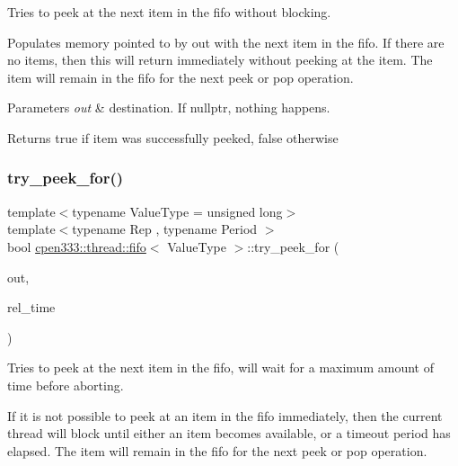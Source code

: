Tries to peek at the next item in the fifo without blocking. 

Populates memory pointed to by {\ttfamily out} with the next item in the fifo. If there are no items, then this will return immediately without peeking at the item. The item will remain in the fifo for the next {\ttfamily peek} or {\ttfamily pop} operation.


\begin{DoxyParams}{Parameters}
{\em out} & destination. If {\ttfamily nullptr}, nothing happens. \\
\hline
\end{DoxyParams}
\begin{DoxyReturn}{Returns}
{\ttfamily true} if item was successfully peeked, {\ttfamily false} otherwise 
\end{DoxyReturn}
\mbox{\label{classcpen333_1_1thread_1_1fifo_a1e8fefca92a17bf1662b1747690ecc5d}} 
\subsubsection{\texorpdfstring{try\+\_\+peek\+\_\+for()}{try\_peek\_for()}}
{\footnotesize\ttfamily template$<$typename Value\+Type  = unsigned long$>$ \\
template$<$typename Rep , typename Period $>$ \\
bool \hyperlink{classcpen333_1_1thread_1_1fifo}{cpen333\+::thread\+::fifo}$<$ Value\+Type $>$\+::try\+\_\+peek\+\_\+for (\begin{DoxyParamCaption}\item[{Value\+Type $\ast$}]{out,  }\item[{std\+::chrono\+::duration$<$ Rep, Period $>$ \&}]{rel\+\_\+time }\end{DoxyParamCaption})\hspace{0.3cm}{\ttfamily [inline]}}



Tries to peek at the next item in the fifo, will wait for a maximum amount of time before aborting. 

If it is not possible to peek at an item in the fifo immediately, then the current thread will block until either an item becomes available, or a timeout period has elapsed. The item will remain in the fifo for the next {\ttfamily peek} or {\ttfamily pop} operation.


